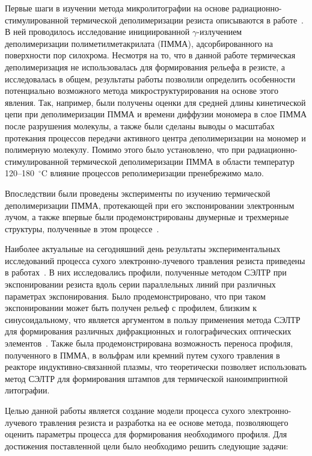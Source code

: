 \previouswork

Первые шаги в изучении метода микролитографии на основе радиационно-стимулированной термической деполимеризации резиста описываются в работе~\cite{Bruk_2000}. В ней проводилось исследование инициированной $\gamma$-излучением деполимеризации полиметилметакрилата (ПММА), адсорбированного на поверхности пор силохрома. Несмотря на то, что в данной работе термическая деполимеризация не использовалась для формирования рельефа в резисте, а исследовалась в общем, результаты работы позволили определить особенности потенциально возможного метода микроструктурирования на основе этого явления. Так, например, были получены оценки для средней длины кинетической цепи при деполимеризации ПММА и времени диффузии мономера в слое ПММА после разрушения молекулы, а также были сделаны выводы о масштабах протекания процессов передачи активного центра деполимеризации на мономер и полимерную молекулу. Помимо этого было установлено, что при радиационно-стимулированной термической деполимеризации ПММА в области температур 120--180~$^\circ$C влияние процессов реполимеризации пренебрежимо мало.

Впоследствии были проведены эксперименты по изучению термической деполимеризации ПММА, протекающей при его экспонировании электронным лучом, а также впервые были продемонстрированы двумерные и трехмерные структуры, полученные в этом процессе~\cite{Bruk_2013}.

Наиболее актуальные на сегодняшний день результаты экспериментальных исследований процесса сухого электронно-лучевого травления резиста приведены в работах~\cite{Bruk_2015_co, Bruk_2016_mee}. В них исследовались профили, полученные методом СЭЛТР при экспонировании резиста вдоль серии параллельных линий при различных параметрах экспонирования. Было продемонстрировано, что при таком экспонировании может быть получен рельеф с профилем, близким к синусоидальному, что является аргументом в пользу применения метода СЭЛТР для формирования различных дифракционных и голографических оптических элементов~\cite{Mitreska_sin_gratings}. Также была продемонстрирована возможность переноса профиля, полученного в ПММА, в вольфрам или кремний путем сухого травления в реакторе индуктивно-связанной плазмы, что теоретически позволяет использовать метод СЭЛТР для формирования штампов для термической наноимпринтной литографии.


\aimsandtasks
Целью данной работы является создание модели процесса сухого электронно-лучевого травления резиста и разработка на ее основе метода, позволяющего оценить параметры процесса для формирования необходимого профиля. Для достижения поставленной цели было необходимо решить следующие задачи:

